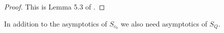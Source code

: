 \documentclass{amsart}
\newtheorem{lemma}[theorem]{Lemma}
\numberwithin{equation}{subsection}
\newtheorem{definition}[theorem]{Definition}
\begin{document}
\begin{proof}
This is Lemma 5.3 of \cite{maier-rassias-gold}.
\end{proof}



%

 In addition to the asymptotics of $S_{c_0}$ we also need asymptotics of $S_Q$.
 
 
\end{document}

